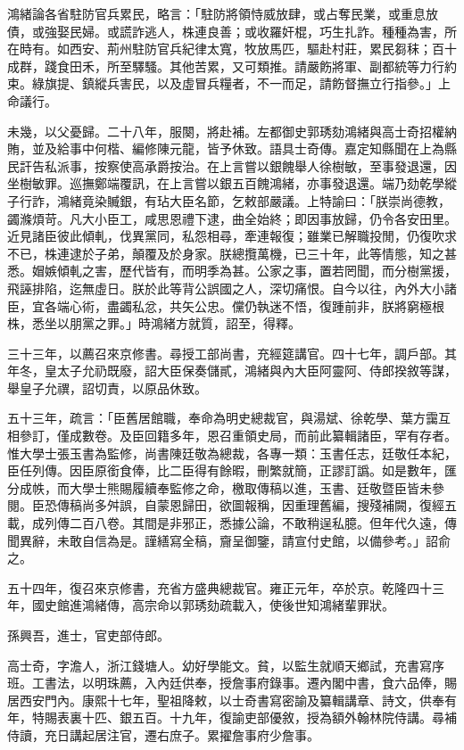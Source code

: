 \begin{pinyinscope}
鴻緒論各省駐防官兵累民，略言：「駐防將領恃威放肆，或占奪民業，或重息放債，或強娶民婦。或謊詐逃人，株連良善；或收羅奸棍，巧生扎詐。種種為害，所在時有。如西安、荊州駐防官兵紀律太寬，牧放馬匹，驅赴村莊，累民芻秣；百十成群，踐食田禾，所至驛騷。其他苦累，又可類推。請嚴飭將軍、副都統等力行約束。綠旗提、鎮縱兵害民，以及虛冒兵糧者，不一而足，請飭督撫立行指參。」上命議行。

未幾，以父憂歸。二十八年，服闋，將赴補。左都御史郭琇劾鴻緒與高士奇招權納賄，並及給事中何楷、編修陳元龍，皆予休致。語具士奇傳。嘉定知縣聞在上為縣民訐告私派事，按察使高承爵按治。在上言嘗以銀餽舉人徐樹敏，至事發退還，因坐樹敏罪。巡撫鄭端覆訊，在上言嘗以銀五百餽鴻緒，亦事發退還。端乃劾乾學縱子行詐，鴻緒竟染贓銀，有玷大臣名節，乞敕部嚴議。上特諭曰：「朕崇尚德教，蠲滌煩苛。凡大小臣工，咸思恩禮下逮，曲全始終；即因事放歸，仍令各安田里。近見諸臣彼此傾軋，伐異黨同，私怨相尋，牽連報復；雖業已解職投閒，仍復吹求不已，株連逮於子弟，顛覆及於身家。朕總攬萬機，已三十年，此等情態，知之甚悉。媢嫉傾軋之害，歷代皆有，而明季為甚。公家之事，置若罔聞，而分樹黨援，飛誣排陷，迄無虛日。朕於此等背公誤國之人，深切痛恨。自今以往，內外大小諸臣，宜各端心術，盡蠲私忿，共矢公忠。儻仍執迷不悟，復踵前非，朕將窮極根株，悉坐以朋黨之罪。」時鴻緒方就質，詔至，得釋。

三十三年，以薦召來京修書。尋授工部尚書，充經筵講官。四十七年，調戶部。其年冬，皇太子允礽既廢，詔大臣保奏儲貳，鴻緒與內大臣阿靈阿、侍郎揆敘等謀，舉皇子允禩，詔切責，以原品休致。

五十三年，疏言：「臣舊居館職，奉命為明史總裁官，與湯斌、徐乾學、葉方靄互相參訂，僅成數卷。及臣回籍多年，恩召重領史局，而前此纂輯諸臣，罕有存者。惟大學士張玉書為監修，尚書陳廷敬為總裁，各專一類：玉書任志，廷敬任本紀，臣任列傳。因臣原銜食俸，比二臣得有餘暇，刪繁就簡，正謬訂譌。如是數年，匯分成帙，而大學士熊賜履續奉監修之命，檄取傳稿以進，玉書、廷敬暨臣皆未參閱。臣恐傳稿尚多舛誤，自蒙恩歸田，欲圖報稱，因重理舊編，搜殘補闕，復經五載，成列傳二百八卷。其間是非邪正，悉據公論，不敢稍逞私臆。但年代久遠，傳聞異辭，未敢自信為是。謹繕寫全稿，齎呈御鑒，請宣付史館，以備參考。」詔俞之。

五十四年，復召來京修書，充省方盛典總裁官。雍正元年，卒於京。乾隆四十三年，國史館進鴻緒傳，高宗命以郭琇劾疏載入，使後世知鴻緒輩罪狀。

孫興吾，進士，官吏部侍郎。

高士奇，字澹人，浙江錢塘人。幼好學能文。貧，以監生就順天鄉試，充書寫序班。工書法，以明珠薦，入內廷供奉，授詹事府錄事。遷內閣中書，食六品俸，賜居西安門內。康熙十七年，聖祖降敕，以士奇書寫密諭及纂輯講章、詩文，供奉有年，特賜表裏十匹、銀五百。十九年，復諭吏部優敘，授為額外翰林院侍講。尋補侍讀，充日講起居注官，遷右庶子。累擢詹事府少詹事。


\end{pinyinscope}
